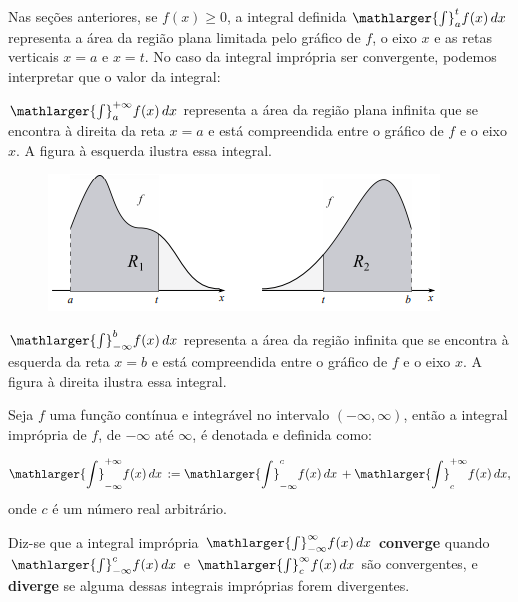 \cleardoublepage\documentclass[../main.tex]{subfiles}
\begin{document}
Nas seções anteriores, se \(f(x)\geq 0\), a integral definida \(\mathlarger{\int}^{t}_{a} f(x)\,dx\) representa a área da região plana limitada pelo gráfico de \(f\), o eixo \(x\) e as retas verticais \(x=a\) e \(x=t\). No caso da integral imprópria ser convergente, podemos interpretar que o valor da integral:
\begin{compactenum}[a)]
\item \(\mathlarger{\int}^{+\infty}_{a} f(x)\,dx\) representa a área da região plana infinita que se encontra à direita da reta \(x=a\) e está compreendida entre o gráfico de \(f\) e o eixo \(x\). A figura à esquerda ilustra essa integral.
\begin{figure}[!htb]
    \centering
    \includegraphics{figs/IntegralImpropria.png}
    \label{fig:IntImpropria}
\end{figure}
\item \(\mathlarger{\int}^{b}_{-\infty} f(x)\,dx\) representa a área da região infinita que se encontra à esquerda da reta \(x=b\) e está compreendida entre o gráfico de \(f\) e o eixo \(x\). A figura à direita ilustra essa integral.
\end{compactenum}

\begin{framed}
\begin{definition}\label{def:IntImpInfinity}
Seja \(f\) uma função contínua e integrável no intervalo \((-\infty,\infty)\), então a integral imprópria de $f$, de $-\infty$ até \(\infty\), é denotada e definida como:

\[ \mathlarger{\int}^{+\infty}_{-\infty} f(x)\,dx\,:=\mathlarger{\int}^{c}_{-\infty} f(x)\,dx\,+ \mathlarger{\int}^{+\infty}_{c} f(x)\,dx, \]
onde \(c\) é um número real arbitrário.

Diz-se que a integral imprópria \(\mathlarger{\int}^{\infty}_{-\infty} f(x)\,dx\) \textbf{converge} quando $\mathlarger{\int}^{c}_{-\infty} f(x)\,dx$ e \(\mathlarger{\int}^{\infty}_{c} f(x)\,dx\) são convergentes, e \textbf{diverge} se alguma dessas integrais impróprias forem divergentes.
\end{definition}
\end{framed}
\end{document}
